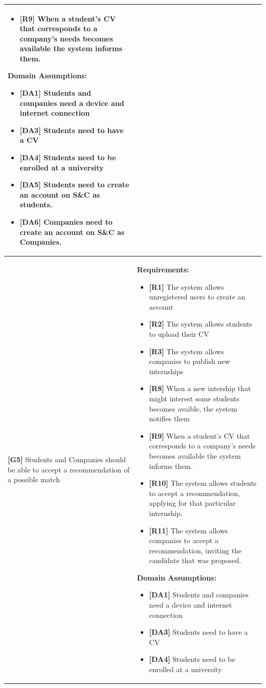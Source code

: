 \begin{longtable}{|p{}|p{}|}
\begin{itemize}
    \item \textbf{[R9]} When a student’s CV that corresponds to a company’s needs becomes available the system informs them.
\end{itemize}
\textbf{Domain Assumptions:}
\begin{itemize}
    \item \textbf{[DA1]} Students and companies need a device and internet connection
    \item \textbf{[DA3]} Students need to have a CV
     \item \textbf{[DA4]} Students need to be enrolled at a university
    \item \textbf{[DA5]} Students need to create an account on S\&C as students.
    \item \textbf{[DA6]} Companies need to create an account on S\&C as Companies.
\end{itemize} \\
\hline
\textbf{[G5]} Students and Companies should be able to accept a recommendation of a possible match
& 
\textbf{Requirements:}
\begin{itemize}
    \item \textbf{[R1]} The system allows unregistered users to create an account
    \item \textbf{[R2]} The system allows students to upload their CV
    \item \textbf{[R3]} The system allows companies to publish new internships
    \item  \textbf{[R8]} When a new intership that might interest some students becomes avaible, the system notifies them
    \item  \textbf{[R9]} When a student’s CV that corresponds to a company’s needs becomes available the system informs them.
    \item  \textbf{[R10]} The system allows students to accept a recommendation, applying for that particular internship.
    \item  \textbf{[R11]} The system allows companies to accept a recommendation, inviting the candidate that was proposed.
\end{itemize}
\textbf{Domain Assumptions:}
\begin{itemize}
     \item \textbf{[DA1]} Students and companies need a device and internet connection
     \item \textbf{[DA3]} Students need to have a CV
     \item \textbf{[DA4]} Students need to be enrolled at a university

\end{itemize}
\end{longtable}
